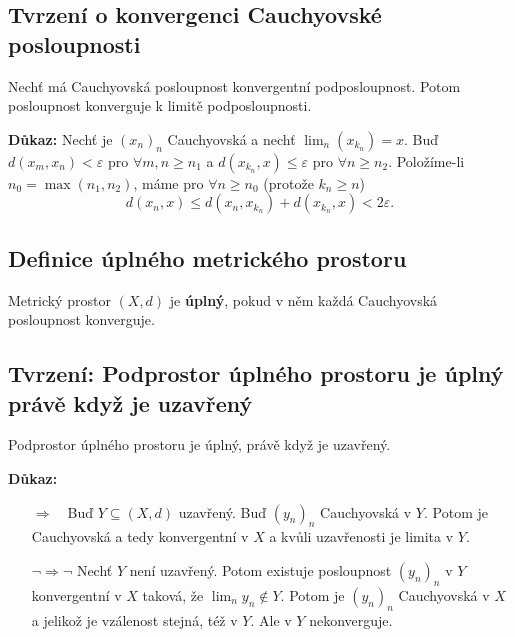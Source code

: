 \documentclass[../main.tex]{subfiles}
\begin{document}
\subsection{Tvrzení o konvergenci Cauchyovské posloupnosti}
\hspace{1.2mm}
\noindent
Nechť má Cauchyovská posloupnost konvergentní podposloupnost. Potom posloupnost konverguje k limitě
podposloupnosti.

\vspace{5mm}
\noindent
\textbf{Důkaz:} Nechť je $(x_n)_n$ Cauchyovská a nechť $\lim_{n}(x_{k_n}) = x.$ Buď $d(x_m,x_n) < \varepsilon$ pro $ \forall m,n \geq n_1$ 
a $d(x_{k_n},x) \leq \varepsilon$ pro $\forall n \geq n_2$. Položíme-li $n_0 = \max(n_1,n_2)$, máme pro $\forall n \geq n_0$ (protože $k_n \geq n$)
\[d(x_n,x) \leq d(x_n,x_{k_n}) + d(x_{k_n},x) < 2\varepsilon.\]

\subsection{Definice úplného metrického prostoru}
\hspace{1.2mm}
\noindent
Metrický prostor $(X,d)$ je \textbf{úplný}, pokud v něm každá Cauchyovská posloupnost konverguje.

\subsection{Tvrzení: Podprostor úplného prostoru je úplný právě když je uzavřený}
\hspace{1.2mm}
\noindent
Podprostor úplného prostoru je úplný, právě když je uzavřený.

\vspace{5mm}
\noindent
\textbf{Důkaz:} 
\begin{enumerate}
	\item[$\Rightarrow \phantom{\lnot} $] Buď $Y \subseteq (X,d)$ uzavřený. Buď $(y_n)_n$ Cauchyovská v $Y$. Potom je Cauchyovská 
    a tedy konvergentní v $X$ a kvůli uzavřenosti je limita v $Y$.
    \item[$\lnot \Rightarrow \lnot $] Nechť $Y$ není uzavřený. Potom existuje posloupnost $(y_n)_n$ v $Y$ konvergentní v $X$ taková, že $\lim_n y_n \notin Y$.
    Potom je $(y_n)_n$ Cauchyovská v $X$ a jelikož je vzálenost stejná, též v $Y$. Ale v $Y$ nekonverguje.
\end{enumerate}
\end{document}
